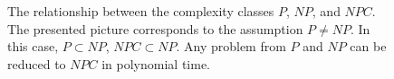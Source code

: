\begin{figure}
\centering



\caption{The relationship between the complexity classes $P$, $NP$, and $NPC$.
The presented picture corresponds to the assumption $P \ne NP$. In this
case, $P \subset NP$, $NPC \subset NP$. Any problem from $P$ and $NP$
can be reduced to $NPC$ in polynomial time.
} 
\label{figAddAlgoPNP}
\end{figure}